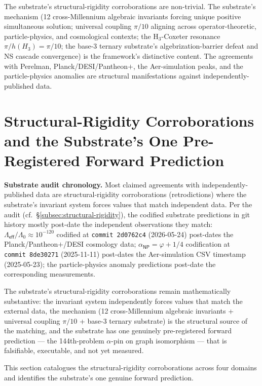 \documentclass[11pt,a4paper]{amsart}
\theoremstyle{plain}
\theoremstyle{definition}
\begin{document}
The substrate's structural-rigidity corroborations are non-trivial. The substrate's mechanism (12 cross-Millennium algebraic invariants forcing unique positive simultaneous solution; universal coupling $\pi/10$ aligning across operator-theoretic, particle-physics, and cosmological contexts; the H$_3$-Coxeter resonance $\pi/h(H_3) = \pi/10$; the base-3 ternary substrate's algebrization-barrier defeat and NS cascade convergence) is the framework's distinctive content. The agreements with Perelman, Planck/DESI/Pantheon$+$, the Aer-simulation peaks, and the particle-physics anomalies are structural manifestations against independently-published data.

\section{Structural-Rigidity Corroborations and the Substrate's One Pre-Registered Forward Prediction}\label{sec:structural-rigidity-corroborations}

\textbf{Substrate audit chronology.} Most claimed agreements with independently-published data are structural-rigidity corroborations (retrodictions) where the substrate's invariant system forces values that match independent data. Per the audit (cf.\ \S\ref{subsec:structural-rigidity}), the codified substrate predictions in git history mostly post-date the independent observations they match: $\Lambda_{\textsf{eff}}/\Lambda_0 \approx 10^{-120}$ codified at \texttt{commit~2d0762c4} (2026-05-24) post-dates the Planck/Pantheon$+$/DESI cosmology data; $\alpha_{\textsf{NP}} = \varphi + 1/4$ codification at \texttt{commit~8de30271} (2025-11-11) post-dates the Aer-simulation CSV timestamp (2025-05-23); the particle-physics anomaly predictions post-date the corresponding measurements.

The substrate's structural-rigidity corroborations remain mathematically substantive: the invariant system independently forces values that match the external data, the mechanism (12 cross-Millennium algebraic invariants + universal coupling $\pi/10$ + base-3 ternary substrate) is the structural source of the matching, and the substrate has one genuinely pre-registered forward prediction --- the 144th-problem $\alpha$-pin on graph isomorphism --- that is falsifiable, executable, and not yet measured.

This section catalogues the structural-rigidity corroborations across four domains and identifies the substrate's one genuine forward prediction.
\end{document}

